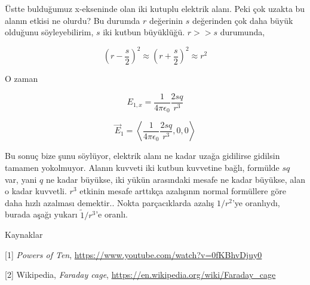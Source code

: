 \documentclass[12pt,fleqn]{article}\usepackage{../../common}
\begin{document}
Üstte bulduğumuz x-ekseninde olan iki kutuplu elektrik alanı. Peki çok uzakta bu
alanın etkisi ne olurdu? Bu durumda $r$ değerinin $s$ değerinden çok daha büyük
olduğunu söyleyebilirim, $s$ iki kutbun büyüklüğü. $r >> s$ durumunda,

$$
\left( r-\frac{s}{2}\right)^2 \approx \left( r+\frac{s}{2}\right)^2 \approx r^2
$$

O zaman

$$
E_{1,x} = \frac{1}{4\pi\epsilon_0} \frac{2sq}{r^3}
$$

$$
\vec{E}_1 = \left<  \frac{1}{4\pi\epsilon_0} \frac{2 sq}{r^3}, 0, 0 \right>
$$

Bu sonuç bize şunu söylüyor, elektrik alanı ne kadar uzağa gidilirse gidilsin
tamamen yokolmuyor. Alanın kuvveti iki kutbun kuvvetine bağlı, formülde $sq$
var, yani $q$ ne kadar büyükse, iki yükün arasındaki mesafe ne kadar büyükse,
alan o kadar kuvvetli. $r^3$ etkinin mesafe arttıkça azalışının normal
formüllere göre daha hızlı azalması demektir.. Nokta parçacıklarda azalış
$1/r^2$'ye oranlıydı, burada aşağı yukarı $\tilde 1/r^3$'e oranlı. 

Kaynaklar

[1] {\em Powers of Ten}, \url{https://www.youtube.com/watch?v=0fKBhvDjuy0}

[2] Wikipedia, {\em Faraday cage}, \url{https://en.wikipedia.org/wiki/Faraday_cage}
\end{document}
